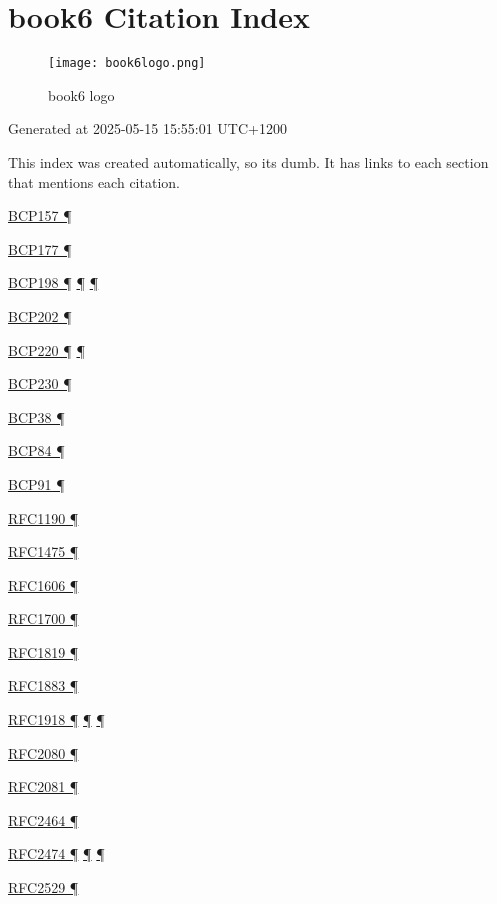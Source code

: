 \documentclass[
]{article}
\begin{document}
\pagebreak

\section{book6 Citation Index}\label{book6-citation-index}

\begin{figure}
\centering
\texttt{[image: book6logo.png]}
\caption{book6 logo}
\end{figure}

Generated at 2025-05-15 15:55:01 UTC+1200

This index was created automatically, so it\textquotesingle s dumb. It
has links to each section that mentions each citation.

\hyperref[addresses]{BCP157 ¶}

\hyperref[coexistence-with-legacy-ipv4]{BCP177 ¶}

\hyperref[addresses]{BCP198 ¶} \hyperref[routing]{¶}
\hyperref[markdown-usage]{¶}

\hyperref[energy-consumption]{BCP202 ¶}

\hyperref[ipv6-basic-technology]{BCP220 ¶} \hyperref[further-reading]{¶}

\hyperref[extension-headers-and-options]{BCP230 ¶}

\hyperref[filtering]{BCP38 ¶}

\hyperref[multi-prefix-operation]{BCP84 ¶}

\hyperref[dns]{BCP91 ¶}

\hyperref[why-version-6]{RFC1190 ¶}

\hyperref[why-version-6]{RFC1475 ¶}

\hyperref[why-version-6]{RFC1606 ¶}

\hyperref[why-version-6]{RFC1700 ¶}

\hyperref[why-version-6]{RFC1819 ¶}

\hyperref[why-version-6]{RFC1883 ¶}

\hyperref[dual-stack-scenarios]{RFC1918 ¶} \hyperref[tunnels]{¶}
\hyperref[obsolete-features-in-ipv6]{¶}

\hyperref[routing]{RFC2080 ¶}

\hyperref[routing]{RFC2081 ¶}

\hyperref[layer-2-functions]{RFC2464 ¶}

\hyperref[packet-format]{RFC2474 ¶}
\hyperref[traffic-class-and-flow-label]{¶}
\hyperref[transport-protocols]{¶}

\hyperref[obsolete-techniques]{RFC2529 ¶}
\end{document}
